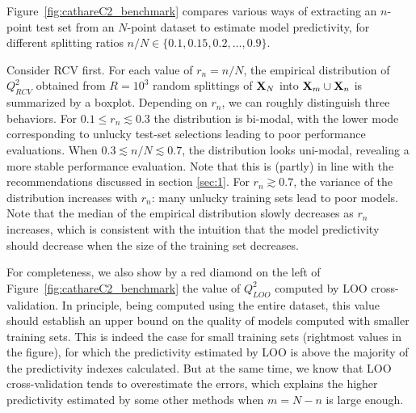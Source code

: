 Figure~\ref{fig:cathareC2_benchmark} compares various ways of extracting an $n$-point test set from an $N$-point dataset to estimate model predictivity, for different splitting ratios $n/N\in\{0.1,0.15,0.2,\ldots,0.9\}$. 

Consider RCV first. For each value of $r_n=n/N$, the empirical distribution of $Q^2_{RCV}$ obtained from $R=10^3$ random splittings of ${\bf X}_N$ into ${\bf X}_m\cup{\bf X}_n$ is summarized by a boxplot. Depending on $r_n$, we can roughly distinguish three behaviors. For $0.1 \leq r_n \lesssim 0.3$ the distribution is bi-modal, with the lower mode corresponding to unlucky test-set selections leading to poor performance evaluations. When $0.3 \lesssim n/N \lesssim 0.7$, the distribution looks uni-modal, revealing a more stable performance evaluation. Note that this is (partly) in line with the recommendations discussed in section \ref{sec:1}. For $r_n \gtrsim  0.7$, the variance of the distribution increases with $r_n$: many unlucky  training sets lead to poor models. Note that the median of the empirical distribution slowly decreases as $r_n$ increases, which is consistent with the intuition that the model predictivity should decrease when the size of the training set decreases. 

For completeness, we also show  by a red diamond on the left of Figure~\ref{fig:cathareC2_benchmark} the value of $Q^2_{LOO}$ computed by LOO cross-validation. In principle, being computed using the entire dataset, this value should establish an upper bound on the quality of models computed with smaller training sets. 
This is indeed the case for small training sets (rightmost values in the figure), for which the predictivity estimated by LOO is above the majority of the predictivity indexes calculated. But at the same time, we know that LOO cross-validation tends to overestimate the errors, which explains the higher predictivity estimated by some other methods when $m=N-n$ is large enough.



